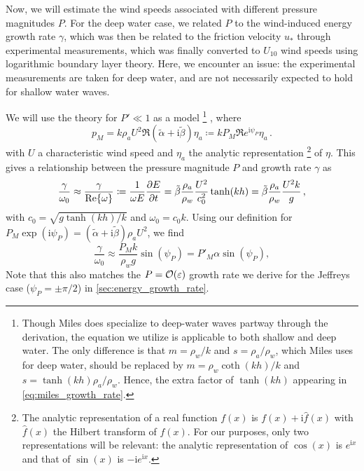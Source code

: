 \documentclass{jfm}
\newcommand{\im}{\mathrm{i}}
\renewcommand*{\epsilon}{\varepsilon}
\begin{document}
Now, we will estimate the wind speeds associated with different pressure
magnitudes $P$.
For the deep water case, we related $P$ to the wind-induced energy growth
rate $\gamma$, which was then be related to the friction velocity $u_*$
through experimental measurements, which was finally converted to
$U_{10}$ wind speeds using logarithmic boundary layer theory.
Here, we encounter an issue: the experimental measurements are taken for
deep water, and are not necessarily expected to hold for shallow water
waves.

We will use the \citet{miles1957generation} theory for $P' \ll 1$ as a model%
\footnote{
  Though Miles does specialize to deep-water waves partway through the
  derivation, the equation we utilize is applicable to both shallow and
  deep water.
  The only difference is that $m = \rho_w/k$ and $s=\rho_a/\rho_w$,
  which Miles uses for deep water, should be replaced by
  $m=\rho_w\coth(kh)/k$ and $s = \tanh(kh) \rho_a/\rho_w$.
  Hence, the extra factor of $\tanh(kh)$ appearing in
  \cref{eq:miles_growth_rate}.
}%
, where
\begin{equation}
  p_M = k \rho_a U^2 \Re{(\tilde{\alpha} + \im \tilde{\beta}) \eta_a}
  \coloneqq k P_M \Re{ e^{\im \psi_P} \eta_a} \,.
\end{equation}
with $U$ a characteristic wind speed and $\eta_a$ the analytic
representation%
\footnote{
  The analytic representation of a real function $f(x)$ is $f(x) + \im
  \hat{f}(x)$ with $\hat{f}(x)$ the Hilbert transform of $f(x)$.
  For our purposes, only two representations will be relevant: the
  analytic representation of $\cos(x)$ is $e^{\im x}$ and that of
  $\sin(x)$ is $-\im e^{\im x}$.
}
of $\eta$.
This gives a relationship between the pressure magnitude $P$ and growth
rate $\gamma$ as
\begin{equation}
  \frac{\gamma}{\omega_0} \approx \frac{\gamma}{\Re{\omega}} \coloneqq
  \frac{1}{\omega E} \pdv{E}{t}
  = \tilde{\beta} \frac{\rho_a}{\rho_w} \frac{U^2}{c_0^2} \tanh(kh)
  = \tilde{\beta} \frac{\rho_a}{\rho_w} \frac{U^2 k}{g} \,,
  \label{eq:miles_growth_rate}
\end{equation}
with $c_0 = \sqrt{g\tanh(kh)/k}$ and $\omega_0 = c_0 k$.
Using our definition for $P_M \exp(\im \psi_P) = (\tilde{\alpha} + \im
\tilde{\beta}) \rho_a U^2$, we find
\begin{equation}
  \frac{\gamma}{\omega_0} \approx \frac{P_M k}{\rho_w g} \sin(\psi_P)
  = P'_M \alpha \sin(\psi_P)
  ,
\end{equation}
Note that this also matches the $P = \order{\epsilon}$ growth rate we
derive for the Jeffreys case (\ie $\psi_P = \pm \pi/2$) in
\cref{sec:energy_growth_rate}.
\end{document}
